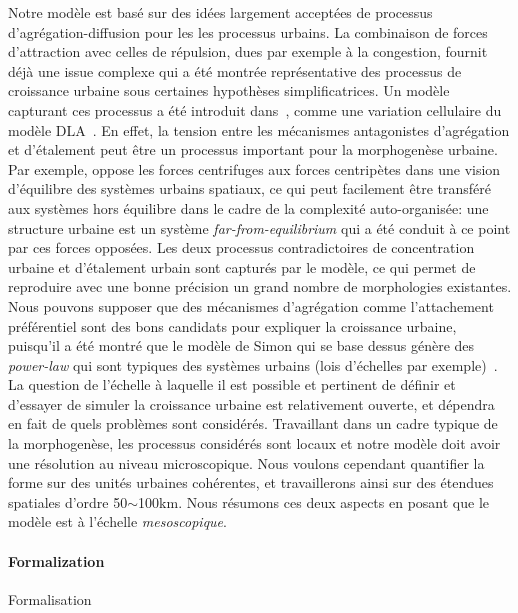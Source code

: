 {}{
Notre modèle est basé sur des idées largement acceptées de processus d'agrégation-diffusion pour les les processus urbains. La combinaison de forces d'attraction avec celles de répulsion, dues par exemple à la congestion, fournit déjà une issue complexe qui a été montrée représentative des processus de croissance urbaine sous certaines hypothèses simplificatrices. Un modèle capturant ces processus a été introduit dans~\cite{batty2006hierarchy}, comme une variation cellulaire du modèle DLA~\cite{batty1991generating}. En effet, la tension entre les mécanismes antagonistes d'agrégation et d'étalement peut être un processus important pour la morphogenèse urbaine. Par exemple, \cite{fujita1996economics} oppose les forces centrifuges aux forces centripètes dans une vision d'équilibre des systèmes urbains spatiaux, ce qui peut facilement être transféré aux systèmes hors équilibre dans le cadre de la complexité auto-organisée: une structure urbaine est un système \emph{far-from-equilibrium} qui a été conduit à ce point par ces forces opposées. Les deux processus contradictoires de concentration urbaine et d'étalement urbain sont capturés par le modèle, ce qui permet de reproduire avec une bonne précision un grand nombre de morphologies existantes. Nous pouvons supposer que des mécanismes d'agrégation comme l'attachement préférentiel sont des bons candidats pour expliquer la croissance urbaine, puisqu'il a été montré que le modèle de Simon qui se base dessus génère des \emph{power-law} qui sont typiques des systèmes urbains (lois d'échelles par exemple)~\cite{2016arXiv160806313S}. La question de l'échelle à laquelle il est possible et pertinent de définir et d'essayer de simuler la croissance urbaine est relativement ouverte, et dépendra en fait de quels problèmes sont considérés. Travaillant dans un cadre typique de la morphogenèse, les processus considérés sont locaux et notre modèle doit avoir une résolution au niveau microscopique. Nous voulons cependant quantifier la forme sur des unités urbaines cohérentes, et travaillerons ainsi sur des étendues spatiales d'ordre 50$\sim$100km. Nous résumons ces deux aspects en posant que le modèle est à l'échelle \emph{mesoscopique}.
}

\paragraph{Formalization}{Formalisation}


